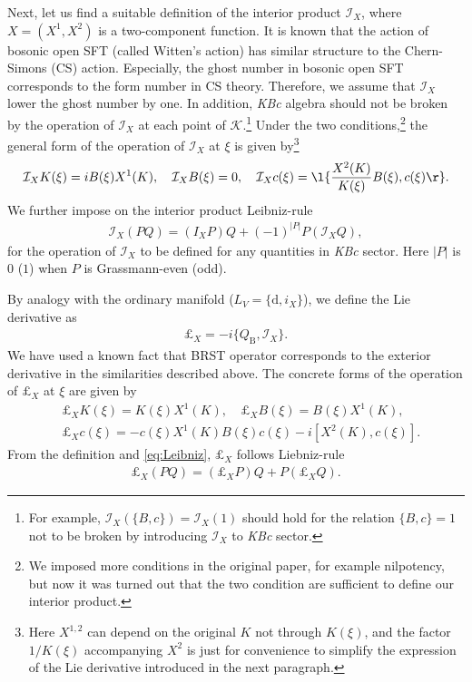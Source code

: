 \documentclass[12pt]{article}
\begin{document}
Next, let us find a suitable definition of the interior product $\mathcal I_X$, 
where $X = (X^1,X^2)$ is a two-component function.
It is known that the action of bosonic open SFT (called Witten's action) has similar structure to the Chern-Simons (CS) action.
Especially, the ghost number in bosonic open SFT corresponds to the form number in CS theory.
Therefore, we assume that $\mathcal I_X$ lower the ghost number by one.
In addition, \textit{KBc} algebra should not be broken by the operation of $\mathcal I_X$ at each point of $\mathcal K$.\footnote{
For example, $\mathcal I_X(\{B,c\}) = \mathcal I_X (1)$ should hold for the relation $\{B,c\} = 1$ not to be broken by introducing $\mathcal I_X$ to \textit{KBc} sector.
}
Under the two conditions,\footnote{
We imposed more conditions in the original paper, for example nilpotency, 
but now it was turned out that the two condition are sufficient to define our interior product.}
the general form of the operation of $\mathcal I_X$ at $\xi$ is given by\footnote{
Here $X^{1,2}$ can depend on the original $K$ not through $K(\xi)$, and the factor $1/K(\xi)$ accompanying $X^2$ is just for
 convenience to simplify the expression of the Lie derivative introduced in the next paragraph.
}
\begin{align}
	\mathcal I_X K(\xi)= iB(\xi)X^1(K),\quad
	\mathcal I_X B(\xi) = 0,\quad
	\mathcal I_X c(\xi) = \l\{\frac{X^2(K)}{K(\xi)}B(\xi),c(\xi)\r\}.\label{eq:interior}
\end{align}
We further impose on the interior product Leibniz-rule
\begin{align}
	\mathcal I_X (PQ) = (I_X P)Q + (-1)^{|P|}P(\mathcal I_X Q),\label{eq:Leibniz}
\end{align}
for the operation of $\mathcal I_X$ to be defined for any quantities in \textit{KBc} sector.
Here $|P|$ is $0$ ($1$) when $P$ is Grassmann-even (odd).

By analogy with the ordinary manifold ($L_V = \{\mathrm{d},i_X\}$), we define the Lie derivative as
\begin{align}
	\pounds_X = -i\{Q_\mathrm{B},\mathcal I_X\}.
\end{align}
We have used a known fact that BRST operator corresponds to the exterior derivative in the similarities described above.
The concrete forms of the operation of $\pounds_X$ at $\xi$ are given by
\begin{align}
	&\pounds_X K(\xi) = K(\xi)X^1(K),\quad
	\pounds_X B(\xi) = B(\xi)X^1(K),\nonumber\\
	&\pounds_X c(\xi) = -c(\xi)X^1(K)B(\xi)c(\xi) - i[X^2(K),c(\xi)].
\end{align}
From the definition and  \eqref{eq:Leibniz}, $\pounds_X$ follows Liebniz-rule
\begin{align}
		\pounds_X (PQ) = (\pounds_X P)Q + P(\pounds_X Q).
\end{align}
\end{document}

